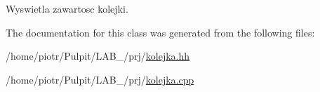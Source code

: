 \-Wyswietla zawartosc kolejki. 



\-The documentation for this class was generated from the following files\-:\begin{DoxyCompactItemize}
\item 
/home/piotr/\-Pulpit/\-L\-A\-B\-\_/prj/\hyperlink{kolejka_8hh}{kolejka.\-hh}\item 
/home/piotr/\-Pulpit/\-L\-A\-B\-\_/prj/\hyperlink{kolejka_8cpp}{kolejka.\-cpp}\end{DoxyCompactItemize}
